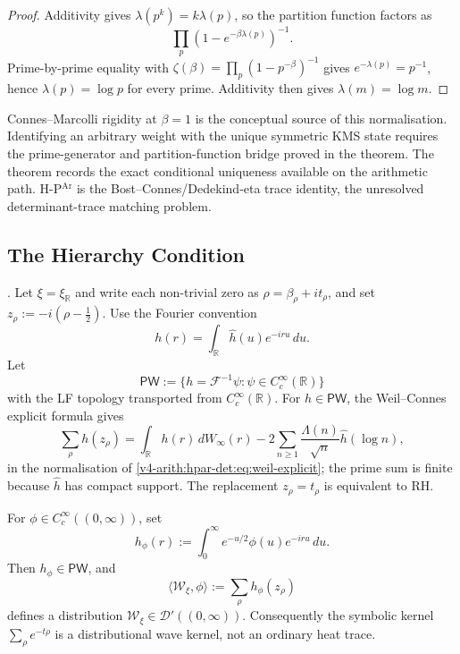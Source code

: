 \begin{proof}
Additivity gives \(\lambda(p^{k})=k\lambda(p)\), so the partition
function factors as
\[
 \prod_{p}(1-e^{-\beta\lambda(p)})^{-1}.
\]
Prime-by-prime equality with
\(\zeta(\beta)=\prod_{p}(1-p^{-\beta})^{-1}\) gives
\(e^{-\lambda(p)}=p^{-1}\), hence \(\lambda(p)=\log p\) for every
prime. Additivity then gives \(\lambda(m)=\log m\).
\end{proof}

\begin{remark}
\label{v4-arith:hpar-det:rem:conditional-uniqueness}
Connes--Marcolli rigidity at \(\beta=1\) is the conceptual source of
this normalisation. Identifying an arbitrary weight with the unique
symmetric KMS state requires the prime-generator and partition-function
bridge proved in the theorem. The theorem records the exact conditional
uniqueness available on the arithmetic path. H-P\(^{\mathrm{Ar}}\) is the
Bost--Connes/Dedekind-eta trace identity, the unresolved
determinant-trace matching problem.
\end{remark}

\subsection{The Hierarchy Condition}
\label{v4-arith:hpar-det:hierarchy}

\begin{lemma}
\label{v4-arith:hpar-det:lem:PW-wave-regularisation}
\ClaimStatusProvedHere. Let \(\xi=\xi_{\mathbb R}\) and write each
non-trivial zero as \(\rho=\beta_{\rho}+it_{\rho}\), and set
\(z_{\rho}:=-i(\rho-\tfrac12)\). Use the Fourier
convention
\[
h(r)=\int_{\mathbb R}\widehat h(u)e^{-iru}\,du .
\]
Let
\[
\mathsf{PW}:=\{h=\mathcal F^{-1}\psi:\psi\in C_c^\infty(\mathbb R)\}
\]
with the LF topology transported from \(C_c^\infty(\mathbb R)\). For
\(h\in\mathsf{PW}\), the Weil--Connes explicit formula gives
\begin{equation}
\label{v4-arith:hpar-det:eq:PW-weil}
\sum_{\rho}h(z_{\rho})
=\int_{\mathbb R}h(r)\,dW_{\infty}(r)
-2\sum_{n\geq1}\frac{\Lambda(n)}{\sqrt n}\widehat h(\log n),
\end{equation}
in the normalisation of \eqref{v4-arith:hpar-det:eq:weil-explicit};
the prime sum is finite because \(\widehat h\) has compact support.
The replacement \(z_{\rho}=t_{\rho}\) is equivalent to RH.

For \(\phi\in C_c^\infty((0,\infty))\), set
\[
h_{\phi}(r):=\int_0^\infty e^{-u/2}\phi(u)e^{-iru}\,du .
\]
Then \(h_{\phi}\in\mathsf{PW}\), and
\[
\langle\mathcal W_{\xi},\phi\rangle
:=\sum_{\rho}h_{\phi}(z_{\rho})
\]
defines a distribution \(\mathcal W_{\xi}\in\mathcal D'((0,\infty))\).
Consequently the symbolic kernel \(\sum_{\rho}e^{-t\rho}\) is a
distributional wave kernel, not an ordinary heat trace.
\end{lemma}

